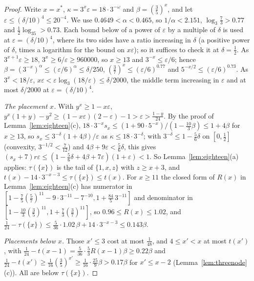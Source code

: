 \documentclass[11pt]{article}
\begin{document}
\begin{proof}
Write $x=x^*$, $\kappa=3^x\varepsilon=18\cdot3^{-\omega}$ and
$\beta=(\tfrac35)^x$, and let $\varepsilon\le(\delta/10)^4\le20^{-4}$.  We
use $0.4649<\alpha<0.465$, so $1/\alpha<2.151$, $\log_3\tfrac73>0.77$ and
$\tfrac12\log_35>0.73$.  Each bound below of a power of $\varepsilon$ by a
multiple of $\delta$ is used at $\varepsilon=(\delta/10)^4$, where its two
sides have a ratio increasing in $\delta$ (a positive power of $\delta$,
times a logarithm for the bound on $x\varepsilon$); so it suffices to check
it at $\delta=\tfrac12$.  As
$3^{x+1}\varepsilon\ge18$, $3^x\ge6/\varepsilon\ge960000$, so $x\ge13$ and
$3^{-x}\le\varepsilon/6$; hence $\beta=(3^{-x})^\alpha\le(\varepsilon/6)^\alpha
\le\delta/250$, $(\tfrac37)^x\le(\varepsilon/6)^{0.77}$ and
$5^{-x/2}\le(\varepsilon/6)^{0.73}$.  As $3^x<18/\varepsilon$,
$x\varepsilon<\varepsilon\log_3(18/\varepsilon)\le\delta/2000$, the middle
term increasing in $\varepsilon$ and at most $\delta/2000$ at
$\varepsilon=(\delta/10)^4$.

\emph{The placement $x$.}  With $y^x\ge1-x\varepsilon$,
$y^x(1+y)-y^2\ge(1-x\varepsilon)(2-\varepsilon)-1>\varepsilon>\tfrac{1-y}{24}$.
By the proof of Lemma~\ref{lem:eighteen}(c),
$18\cdot3^{-x}s_x\le(1+90\cdot5^{-x})/(1-\tfrac{10}3\beta)\le1+4\beta$ for
$x\ge13$, so $s_x\le3^{-\delta}(1+4\beta)/\varepsilon$ as
$\kappa\le18\cdot3^{-\delta}$; with $3^{-\delta}\le1-\tfrac56\delta$ on
$[0,\tfrac12]$ (convexity, $3^{-1/2}<\tfrac7{12}$) and
$4\beta+9\varepsilon<\tfrac56\delta$, this gives
$(s_x+7)r\varepsilon\le(1-\tfrac56\delta+4\beta+7\varepsilon)(1+\varepsilon)<1$.
So Lemma~\ref{lem:eighteen}(a) applies: $\tau(\{x\})$ is the tail of
$\{1,x,z\}$ with $z\ge x+3$, and $t(x)-14\cdot3^{-x-3}\le\tau(\{x\})\le t(x)$.
For $x\ge11$ the closed form of $R(x)$ in Lemma~\ref{lem:eighteen}(c) has
numerator in $[1-\tfrac75(\tfrac57)^{11}-9\cdot3^{-11}-7^{-10},1+\tfrac{84}5\,3^{-11}]$
and denominator in $[1-\tfrac{10}3(\tfrac35)^{11},1+\tfrac73(\tfrac37)^{11}]$,
so $0.96\le R(x)\le1.02$, and
$\tfrac1{24}-\tau(\{x\})\le\tfrac5{36}\cdot1.02\,\beta+14\cdot3^{-x-3}\le0.143\beta$.

\emph{Placements below $x$.}  Those $x'\le3$ cost at most $\tfrac1{48}$, and
$4\le x'<x$ at most $t(x')$, with
$\tfrac1{24}-t(x-1)=\tfrac5{36}\cdot\tfrac53R(x-1)\beta\ge0.22\beta$ and
$\tfrac1{24}-t(x')\ge\tfrac1{16}(\tfrac35)^{x'}\ge\tfrac1{16}\cdot\tfrac{25}9\beta>0.17\beta$
for $x'\le x-2$ (Lemma~\ref{lem:threenode}(c)).  All are below
$\tau(\{x\})$.


\end{proof}
\end{document}
